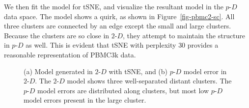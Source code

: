 \documentclass[
  12pt]{article}
\newcommand\pD{$p\text{-}D$}
\newcommand\gD{$2\text{-}D$}
\begin{document}
We then fit the model for tSNE, and visualize the resultant model in the
\pD{} data space. The model shows a quirk, as shown in
Figure~\ref{fig-pbmc2-sc}. All three clusters are connected by an edge
except the small and large clusters. Because the clusters are so close
in \gD{}, they attempt to maintain the structure in \pD{} as well. This
is evident that tSNE with perplexity \(30\) provides a reasonable
representation of PBMC3k data.

\begin{figure}[H]


\caption{\label{fig-model-pbmc}(a) Model generated in \(2\text{-}D\)
with tSNE, and (b) \(p\text{-}D\) model error in \(2\text{-}D\). The
\(2\text{-}D\) model shows three well-separated distant clusters. The
\(p\text{-}D\) model errors are distributed along clusters, but most low
\(p\text{-}D\) model errors present in the large cluster.}

\end{figure}%
\end{document}

